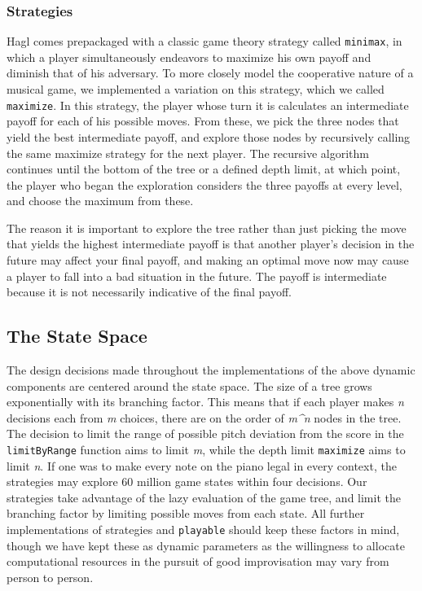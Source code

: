 \documentclass{article}
\begin{document}
\subsubsection{Strategies}

Hagl comes prepackaged with a classic game theory strategy
called \texttt{minimax}, in which a player simultaneously endeavors to
maximize his own payoff and diminish that of his adversary. To more
closely model the cooperative nature of a musical game, we implemented a
variation on this strategy, which we called \texttt{maximize}. In this
strategy, the player whose turn it is calculates an intermediate payoff
for each of his possible moves. From these, we pick the three nodes that
yield the best intermediate payoff, and explore those nodes by
recursively calling the same maximize strategy for the next player. The
recursive algorithm continues until the bottom of the tree or a defined
depth limit, at which point, the player who began the exploration
considers the three payoffs at every level, and choose the maximum from
these.

The reason it is important to explore the tree rather than
just picking the move that yields the highest intermediate payoff is
that another player's decision in the future may affect your final
payoff, and making an optimal move now may cause a player to fall into a
bad situation in the future. The payoff is intermediate because it is
not necessarily indicative of the final
payoff.

\subsection{The State Space}

The design decisions made throughout the implementations of the above
dynamic components are centered around the state space. The size of a
tree grows exponentially with its branching factor. This means that if
each player makes \emph{n} decisions each from \emph{m} choices,
there are on the order of \emph{m\^{}n} nodes in the tree. The decision
to limit the range of possible pitch deviation from the score in the
\texttt{limitByRange} function aims to limit \emph{m}, while the depth
limit \texttt{maximize} aims to limit \emph{n}. If one was to make
every note on the piano legal in every context, the strategies may
explore 60 million game states within four
decisions. Our strategies take advantage of the lazy
evaluation of the game tree, and limit the branching factor by
limiting possible moves from each state. All further implementations of
strategies and \texttt{playable} should keep these factors in mind,
though we have kept these as dynamic parameters as the
willingness to allocate computational resources in the pursuit of good
improvisation may vary from person to person.
\end{document}
